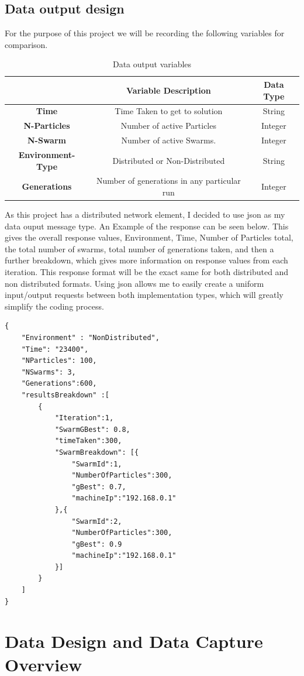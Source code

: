 \documentclass[oneside,12pt]{book}
\begin{document}
\subsection{Data output design}
For the purpose of this project we will be recording the following variables for comparison. 
\begin{table}[H]
  \centering
    \begin{tabular}{| c | c | c |}
    \hline
     & \textbf{Variable Description} & \textbf{Data Type} \\ \hline
    \textbf{Time} & Time Taken to get to solution & String \\ \hline
    \textbf{N-Particles} & Number of active Particles  & Integer \\ \hline
    \textbf{N-Swarm} & Number of active Swarms. & Integer \\ \hline
    \textbf{Environment-Type} & Distributed or Non-Distributed & String \\ \hline
    \textbf{Generations} & Number of generations in any particular run & Integer \\ \hline
    \end{tabular}
  \caption{Data output variables}
  \label{tab:data_output_design}
\end{table}
As this project has a distributed network element, I decided to use json as my data ouput message type. An Example of the response can be seen below. This gives the overall response values, Environment, Time, Number of Particles total, the total number of swarms, total number of generations taken, and then a further breakdown, which gives more information on response values from each iteration. This response format will be the exact same for both distributed and non distributed formats. Using json allows me to easily create a uniform input/output requests between both implementation types, which will greatly simplify the coding process. 
\begin{lstlisting}
{
	"Environment" : "NonDistributed",
	"Time": "23400",
	"NParticles": 100,
	"NSwarms": 3,
	"Generations":600,
	"resultsBreakdown" :[
		{
			"Iteration":1,
			"SwarmGBest": 0.8,
			"timeTaken":300,
			"SwarmBreakdown": [{
				"SwarmId":1,
				"NumberOfParticles":300,
				"gBest": 0.7,
				"machineIp":"192.168.0.1"
			},{
				"SwarmId":2,
				"NumberOfParticles":300,
				"gBest": 0.9
				"machineIp":"192.168.0.1"
			}]
		}
	]
}
\end{lstlisting}

\section{Data Design and Data Capture Overview}
\end{document}
